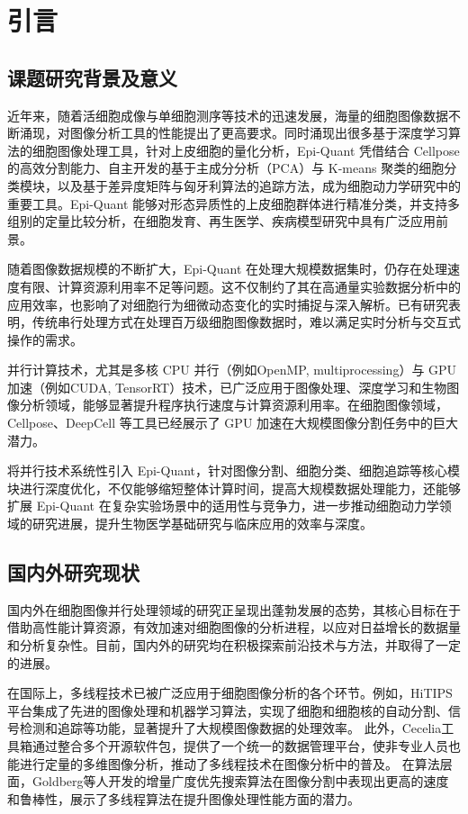 \section{引言}

\subsection{课题研究背景及意义}

近年来，随着活细胞成像与单细胞测序等技术的迅速发展，海量的细胞图像数据不断涌现，对图像分析工具的性能提出了更高要求。同时涌现出很多基于深度学习算法的细胞图像处理工具\cite{ref1}，针对上皮细胞的量化分析，Epi-Quant 凭借结合 Cellpose 的高效分割能力、自主开发的基于主成分分析（PCA）与 K-means 聚类的细胞分类模块，以及基于差异度矩阵与匈牙利算法的追踪方法，成为细胞动力学研究中的重要工具\cite{ref2}。Epi-Quant 能够对形态异质性的上皮细胞群体进行精准分类，并支持多组别的定量比较分析，在细胞发育、再生医学、疾病模型研究中具有广泛应用前景。

随着图像数据规模的不断扩大，Epi-Quant 在处理大规模数据集时，仍存在处理速度有限、计算资源利用率不足等问题。这不仅制约了其在高通量实验数据分析中的应用效率，也影响了对细胞行为细微动态变化的实时捕捉与深入解析。已有研究表明，传统串行处理方式在处理百万级细胞图像数据时，难以满足实时分析与交互式操作的需求。

并行计算技术，尤其是多核 CPU 并行（例如OpenMP, multiprocessing）与 GPU 加速（例如CUDA, TensorRT）技术\cite{ref3}\cite{ref4}，已广泛应用于图像处理、深度学习和生物图像分析领域，能够显著提升程序执行速度与计算资源利用率。在细胞图像领域，Cellpose、DeepCell 等工具已经展示了 GPU 加速在大规模图像分割任务中的巨大潜力\cite{ref5}。

将并行技术系统性引入 Epi-Quant，针对图像分割、细胞分类、细胞追踪等核心模块进行深度优化，不仅能够缩短整体计算时间，提高大规模数据处理能力，还能够扩展 Epi-Quant 在复杂实验场景中的适用性与竞争力，进一步推动细胞动力学领域的研究进展，提升生物医学基础研究与临床应用的效率与深度。
\subsection{国内外研究现状}

国内外在细胞图像并行处理领域的研究正呈现出蓬勃发展的态势，其核心目标在于借助高性能计算资源，有效加速对细胞图像的分析进程，以应对日益增长的数据量和分析复杂性。\cite{ref7}目前，国内外的研究均在积极探索前沿技术与方法，并取得了一定的进展。

在国际上，多线程技术已被广泛应用于细胞图像分析的各个环节。例如，HiTIPS平台集成了先进的图像处理和机器学习算法，实现了细胞和细胞核的自动分割、信号检测和追踪等功能，显著提升了大规模图像数据的处理效率\cite{ref8}。 此外，Cecelia工具箱通过整合多个开源软件包，提供了一个统一的数据管理平台，使非专业人员也能进行定量的多维图像分析，推动了多线程技术在图像分析中的普及\cite{ref9}。 在算法层面，Goldberg等人开发的增量广度优先搜索算法在图像分割中表现出更高的速度和鲁棒性，展示了多线程算法在提升图像处理性能方面的潜力\cite{ref10}。 

